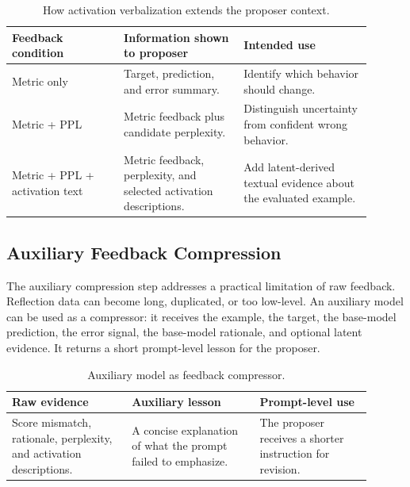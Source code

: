 \documentclass[12pt,a4paper,twoside,openright]{book}
\begin{document}
\begin{table}[!htb]
    \centering
    \small
    \begin{tabular}{p{0.28\linewidth} p{0.30\linewidth} p{0.32\linewidth}}
        \toprule
        \textbf{Feedback condition} & \textbf{Information shown to proposer} & \textbf{Intended use} \\
        \midrule
        Metric only &
        Target, prediction, and error summary. &
        Identify which behavior should change. \\
        Metric + PPL &
        Metric feedback plus candidate perplexity. &
        Distinguish uncertainty from confident wrong behavior. \\
        Metric + PPL + activation text &
        Metric feedback, perplexity, and selected activation descriptions. &
        Add latent-derived textual evidence about the evaluated example. \\
        \bottomrule
    \end{tabular}
    \caption{How activation verbalization extends the proposer context.}
    \label{tab:nla-feedback}
\end{table}

\subsection{Auxiliary Feedback Compression}
\label{sec:method-aux-judge}

The auxiliary compression step addresses a practical limitation of raw feedback.
Reflection data can become long, duplicated, or too low-level. An auxiliary
model can be used as a compressor: it receives the example, the target, the
base-model prediction, the error signal, the base-model rationale, and optional
latent evidence. It returns a short prompt-level lesson for the proposer.

\begin{table}[!htb]
    \centering
    \small
    \begin{tabular}{p{0.30\linewidth} p{0.32\linewidth} p{0.28\linewidth}}
        \toprule
        \textbf{Raw evidence} & \textbf{Auxiliary lesson} & \textbf{Prompt-level use} \\
        \midrule
        Score mismatch, rationale, perplexity, and activation descriptions. &
        A concise explanation of what the prompt failed to emphasize. &
        The proposer receives a shorter instruction for revision. \\
        \bottomrule
    \end{tabular}
    \caption{Auxiliary model as feedback compressor.}
    \label{tab:aux-judge-feedback}
\end{table}
\end{document}
